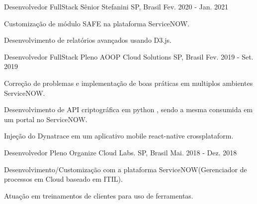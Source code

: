 \begin{cventries}
     \cventry
    {Desenvolvedor FullStack Sênior} %
    {Stefanini} %
    {SP, Brasil} %
    {Fev. 2020 - Jan. 2021} %
    {
    	\begin{cvitems} %
    		\item {Customização de módulo SAFE na plataforma ServiceNOW.}
    		\item {Desenvolvimento de relatórios avançados usando D3.js.}    		
    	\end{cvitems}
    }
    \cventry
    {Desenvolvedor FullStack Pleno} %
    {AOOP Cloud Solutions} %
    {SP, Brasil} %
    {Fev. 2019 - Set. 2019} %
    {
      \begin{cvitems} %
        \item {Correção de problemas e implementação de boas práticas em multiplos ambientes ServiceNOW.}
        \item {Desenvolvimento de API criptográfica em python , sendo a mesma consumida em um portal no ServiceNOW.}
        \item {Injeção do Dynatrace em um aplicativo mobile react-native crossplataform.}
      \end{cvitems}
    }   
	\cventry
	{Desenvolvedor Pleno} %
	{Organize Cloud Labs.} %
	{SP, Brasil} %
	{Mai. 2018 - Dez. 2018} %
	{
		\begin{cvitems} %
			\item {Desenvolvimento/Customização com a plataforma ServiceNOW(Gerenciador de processos em Cloud baseado em ITIL).}
			\item {Atuação em treinamentos de clientes para uso de ferramentas.}
		\end{cvitems}
	}

\end{cventries}

